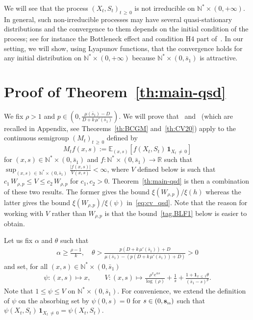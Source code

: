 \documentclass[10pt]{amsart}
\theoremstyle{definition}\newtheorem{defi}[theo]{Definition}\newtheorem{rema}[theo]{Remark}\newtheorem{exam}[theo]{Example}\newtheorem{exem}[theo]{Example}\newtheorem{nota}[theo]{Notation}
\newcommand{\RR}{\mathbb{R}}
\newcommand{\NN}{\mathbb{N}}
\newcommand{\EE}{\mathbb{E}}
\newcommand{\Sin}{{\mathbf s}_{\textrm{\tiny\rm in}}}
\newcommand{\1}{\mathbf{1}}
\begin{document}
We will see that the process $(X_t,S_t)_{t\,\geq\,0}$ is not irreducible on $ \NN^* \times (0,+\infty)$. In general, such non-irreducible processes may have several quasi-stationary distributions and the convergence to them depends on the initial condition of the process; see for instance the Bottleneck effect and condition H4 part of~\cite[Section~3.1]{BCP}. In our setting, we will show, using Lyapunov functions, that the convergence holds for any initial distribution on $ \NN^* \times (0,+\infty)$ because $\NN^* \times (0,\bar s_1)$ is attractive.



\section{Proof of Theorem~\ref{th:main-qsd}}\label{se:proof}



We fix $\rho>1$ and $p\in(0,\frac{\mu(\bar s_1)-D}{D+k\,\mu'(\bar s_1)})$. We will prove that~\cite[Theorem~5.1]{BCGM} and~\cite[Corollary~2.4]{CV20} (which are recalled in Appendix, see Theorems~\ref{th:BCGM} and~\ref{th:CV20}) apply to the continuous semigroup $(M_t)_{t\,\geq\,0}$ defined by
\begin{equation}\label{eq.def.semigroup}
M_t f(x,s) := \EE_{(x,s)}\left[f(X_t, S_t)\,\1_{X_t\,\neq\,0}\right]
\end{equation}
for $(x,s)\in \NN^*\times (0, \bar s_1)$ and $f:\NN^*\times (0, \bar s_1) \to \RR$ such that $\sup_{(x,s)\,\in\,\NN^*\times (0, \bar s_1)}\frac{|f(x,s)|}{V(x,s)}<\infty$, where $V$ defined below is such that $c_1 \,W_{\rho,p} \leq V \leq c_2\, W_{\rho,p}$ for $c_1,c_2>0$. Theorem~\ref{th:main-qsd} is then a combination of these two results. The former gives the bound $\xi(W_{\rho,p})/\xi(h)$ whereas the latter gives the bound $\xi(W_{\rho,p})/\xi(\psi)$ in~\eqref{eq:cv_qsd}. Note that the reason for working with $V$ rather than $W_{\rho,p}$ is that the bound~\eqref{tag.BLF1} below is easier to obtain.

Let us fix $\alpha$ and $\theta$ such that
\begin{align}\label{hyp:theta_p}
\alpha \geq \frac{\rho-1}{k}, \quad
\theta>\frac{p\left(D+k\,\mu'(\bar s_1)\right)+D}{\mu(\bar s_1)-\left(p(D+k\,\mu'(\bar s_1))+D\right)}>0
\end{align}
and set, for all $(x,s)\in\NN^*\times (0,\bar s_1)$
\begin{align}\label{def:psi_V}
\psi:(x,s) \mapsto x, \qquad V:(x,s) \mapsto \frac{\rho^x e^{\alpha s}}{\log(\rho)} + \frac{1}{s} + \frac{1+\1_{x\,\leq\,1}\theta}{(\bar s_1-s)^{p}}.
\end{align}
Note that $1\leq\psi \leq V$ on $\NN^*\times (0,\bar s_1)$. For convenience, we extend the definition of $\psi$ on the absorbing set by $\psi(0,s)= 0$ for $s\in (0,\Sin)$ such that $\psi(X_t,S_t) \,\1_{X_t\,\neq \,0}=\psi(X_t,S_t)$.
\end{document}
